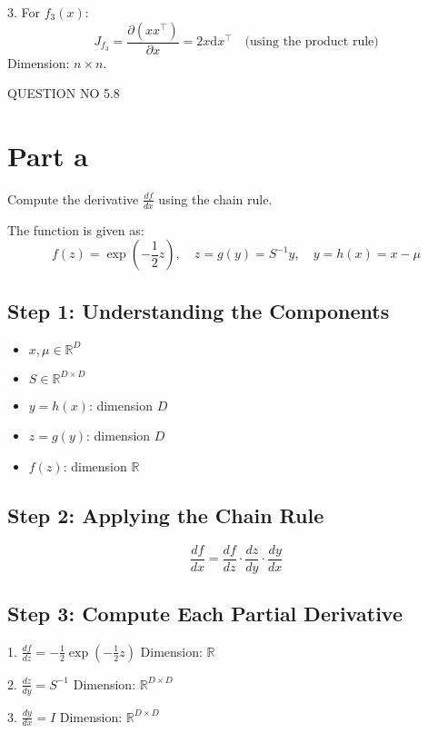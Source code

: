 \documentclass{article}
\begin{document}
3. For \( f_3(x) \):
   \[
   J_{f_3} = \frac{\partial (xx^{\top})}{\partial x} = 2x\mathrm{d}x^{\top} \quad \text{(using the product rule)}
   \]
   Dimension: \( n \times n \).

\begin{center}
    {\Large QUESTION NO 5.8}\\
   \end{center}

\section*{Part a}
Compute the derivative \( \frac{df}{dx} \) using the chain rule. 

The function is given as:
\[
f(z) = \exp\left(-\frac{1}{2} z\right), \quad z = g(y) = S^{-1} y, \quad y = h(x) = x - \mu
\]

\subsection*{Step 1: Understanding the Components}
\begin{itemize}
    \item \( x, \mu \in \mathbb{R}^D \)
    \item \( S \in \mathbb{R}^{D \times D} \)
    \item \( y = h(x) \): dimension \( D \)
    \item \( z = g(y) \): dimension \( D \)
    \item \( f(z) \): dimension \( \mathbb{R} \)
\end{itemize}

\subsection*{Step 2: Applying the Chain Rule}
\[
\frac{df}{dx} = \frac{df}{dz} \cdot \frac{dz}{dy} \cdot \frac{dy}{dx}
\]

\subsection*{Step 3: Compute Each Partial Derivative}
1. \( \frac{df}{dz} = -\frac{1}{2} \exp\left(-\frac{1}{2} z\right) \)
   Dimension: \( \mathbb{R} \)
   
2. \( \frac{dz}{dy} = S^{-1} \)
   Dimension: \( \mathbb{R}^{D \times D} \)

3. \( \frac{dy}{dx} = I \)
   Dimension: \( \mathbb{R}^{D \times D} \)
\end{document}
